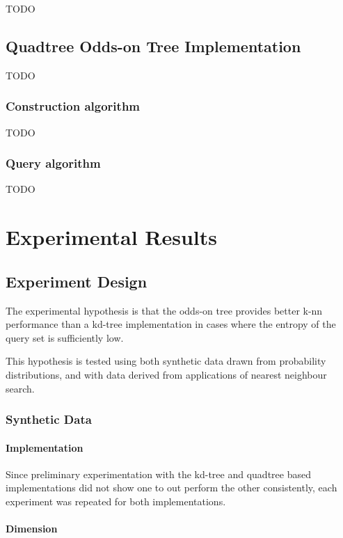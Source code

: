 \documentclass[mcs]{scsthesis}
\begin{document}
TODO

\section{Quadtree Odds-on Tree Implementation}

TODO

\subsection{Construction algorithm}

TODO

\subsection{Query algorithm}

TODO

\chapter{Experimental Results}

\section{Experiment Design}

The experimental hypothesis is that the odds-on tree provides better k-nn
performance than a kd-tree implementation in cases where the entropy of the
query set is sufficiently low.

This hypothesis is tested using both synthetic data drawn from probability
distributions, and with data derived from applications of nearest neighbour
search. 

\subsection{Synthetic Data}

\subsubsection{Implementation}

Since preliminary experimentation with the kd-tree and quadtree based
implementations did not show one to out perform the other consistently, each
experiment was repeated for both implementations.

\subsubsection{Dimension}
\end{document}

